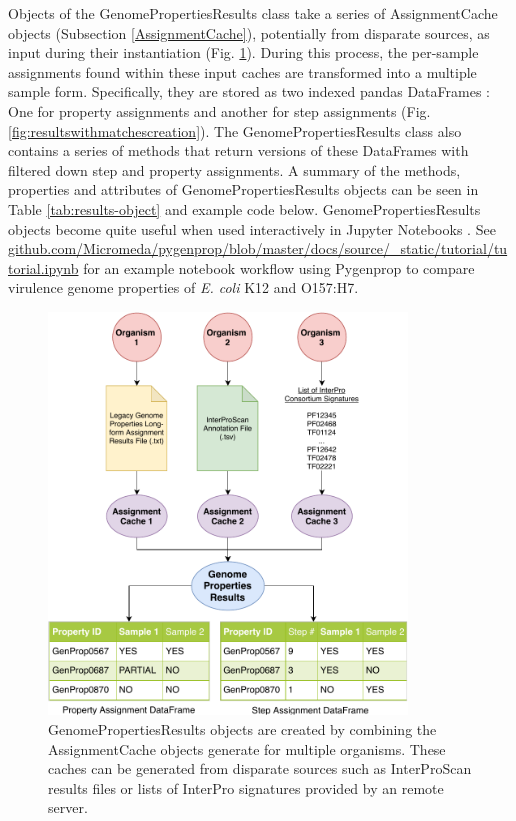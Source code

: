Objects of the GenomePropertiesResults class take a series of AssignmentCache objects (Subsection \ref{AssignmentCache}), potentially from disparate sources, as input during their instantiation (Fig. \ref{fig:resultscreation}). During this process, the per-sample assignments found within these input caches are transformed into a multiple sample form. Specifically, they are stored as two indexed pandas DataFrames \cite{mckinney2010data}: One for property assignments and another for step assignments (Fig. \ref{fig:resultswithmatchescreation}). The GenomePropertiesResults class also contains a series of methods that return versions of these DataFrames with filtered down step and property assignments. A summary of the methods, properties and attributes of GenomePropertiesResults objects can be seen in Table \ref{tab:results-object} and example code below. GenomePropertiesResults objects become quite useful when used interactively in Jupyter Notebooks \cite{kluyver2016jupyter}. See \href{github.com/Micromeda/pygenprop/blob/master/docs/source/\_static/tutorial/tutorial.ipynb}{github.com/Micromeda/pygenprop/blob/master/docs/source/\_static/tutorial/tutorial.ipynb} for an example notebook workflow using Pygenprop to compare virulence genome properties of \textit{E. coli} K12 and O157:H7.

\begin{figure}[!ht]
  \centering
	\includegraphics[width=0.85\textwidth]{media/assignment_results_overview.pdf}
	 \caption{GenomePropertiesResults objects are created by combining the AssignmentCache objects generate for multiple organisms. These caches can be generated from disparate sources such as InterProScan results files or lists of InterPro signatures provided by an remote server.}
	 \label{fig:resultscreation}
\end{figure}

